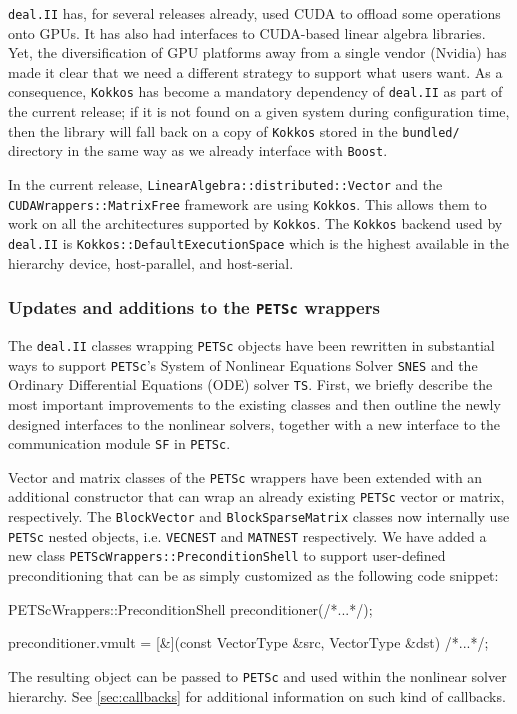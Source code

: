 \documentclass{ansarticle-preprint}
\newcommand{\specialword}[1]{\texttt{#1}}
\newcommand{\dealii}{{\specialword{deal.II}}\xspace}
\newcommand{\petsc}{\specialword{PETSc}\xspace}
\newcommand{\snes}{{\specialword{SNES}}\xspace}
\newcommand{\ts}{{\specialword{TS}}\xspace}
\newcommand{\petscsf}{{\specialword{SF}}\xspace}
\newcommand{\boost}{{\specialword{Boost}}\xspace}
\newcommand{\kokkos}{{\specialword{Kokkos}}\xspace}
\begin{document}
\dealii{} has, for several releases already, used CUDA to offload some
operations onto GPUs. It has also had interfaces to CUDA-based linear
algebra libraries. Yet, the diversification of GPU platforms away from
a single vendor (Nvidia) has made it clear that we need a different
strategy to support what users want. As a consequence, \kokkos has
become a mandatory dependency of \dealii{} as part of the current
release; if it is not found on a given system during configuration
time, then the library will fall back on a copy of \kokkos stored in
the \texttt{bundled/} directory in the same way as we already
interface with \boost.

In the current release, \texttt{LinearAlgebra::distributed::Vector} and the \texttt{CUDAWrappers::MatrixFree} framework are using \kokkos. This allows them to work on
all the architectures supported by \kokkos. The \kokkos backend used by \dealii is
\texttt{Kokkos::DefaultExecutionSpace} which is the highest available in the hierarchy
device, host-parallel, and host-serial.



\subsubsection{Updates and additions to the \petsc wrappers}\label{sec:petsc}

The \dealii classes wrapping \petsc objects have been rewritten in
substantial ways
to support \petsc's System of Nonlinear Equations Solver \snes and the Ordinary Differential Equations (ODE)
solver \ts \cite{abhyankar2018petsc}.
First, we briefly describe the most important improvements to the existing
classes and then outline the newly designed interfaces to the nonlinear solvers, together
with a new interface to the communication module \petscsf in \petsc \cite{zhang2021petscsf}.

Vector and matrix classes of the \petsc wrappers have been extended with an additional constructor
that can wrap an already existing \petsc vector or matrix, respectively.
The \texttt{BlockVector} and
\texttt{BlockSparseMatrix} classes now internally use
\petsc nested objects, i.e. \texttt{VECNEST} and  \texttt{MATNEST} respectively.
We have added a new class \texttt{PETScWrappers::PreconditionShell} to support user-defined
preconditioning that can be as simply customized as the following code
snippet:
\begin{c++}
PETScWrappers::PreconditionShell preconditioner(/*...*/);

preconditioner.vmult = [&](const VectorType &src,
                           VectorType       &dst) {/*...*/};

\end{c++}
The resulting object can be passed to \petsc and used within the nonlinear solver hierarchy.
See \ref{sec:callbacks} for additional information on such kind of callbacks.
\end{document}
